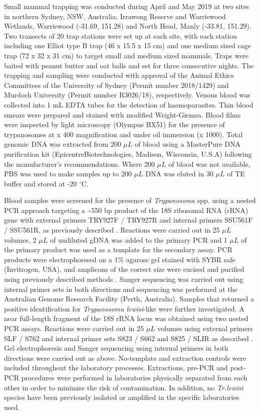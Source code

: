 \documentclass[a4paper, nobind]{templates/ociamthesis}
\begin{document}
Small mammal trapping was conducted during April and May 2019 at two sites in northern Sydney, NSW, Australia; Irrawong Reserve and Warriewood Wetlands, Warriewood (-31.69, 151.28) and North Head, Manly (-33.81, 151.29). Two transects of 20 trap stations were set up at each site, with each station including one Elliot type B trap (46 x 15.5 x 15 cm) and one medium sized cage trap (72 x 32 x 31 cm) to target small and medium sized mammals. Traps were baited with peanut butter and oat balls and set for three consecutive nights. The trapping and sampling were conducted with approval of the Animal Ethics Committees of the University of Sydney (Permit number 2018/1429) and Murdoch University (Permit number R3026/18), respectively. Venous blood was collected into 1 mL EDTA tubes for the detection of haemoparasites. Thin blood smears were prepared and stained with modified Wright-Giemsa. Blood films were inspected by light microscopy (Olympus BX51) for the presence of trypanosomes at x 400 magnification and under oil immersion (x 1000). Total genomic DNA was extracted from 200 \(\mu L\) of blood using a MasterPure DNA purification kit (Epicentre\textregistered Biotechnologies, Madison, Wisconsin, U.S.A) following the manufacturer's recommendations. Where 200 \(\mu L\) of blood was not available, PBS was used to make samples up to 200 \(\mu L\) DNA was eluted in 30 \(\mu L\) of TE buffer and stored at -20 \(^\circ\)C.

Blood samples were screened for the presence of \emph{Trypanosoma} spp. using a nested PCR approach targeting a \textasciitilde550 bp product of the 18S ribosomal RNA (rRNA) gene with external primers TRY927F / TRY927R and internal primers SSU561F / SSU561R, as previously described \autocite{noyesNestedPCRSsrRNA1999}. Reactions were carried out in 25 \(\mu L\) volumes, 2 \(\mu L\) of undiluted gDNA was added to the primary PCR and 1 \(\mu L\) of the primary product was used as a template for the secondary assay. PCR products were electrophoresed on a 1\% agarose gel stained with SYBR safe (Invitrogen, USA), and amplicons of the correct size were excised and purified using previously described methods \autocite{yangSpecificQuantitativeDetection2013}. Sanger sequencing was carried out using internal primer sets in both directions and sequencing was performed at the Australian Genome Research Facility (Perth, Australia). Samples that returned a positive identification for \emph{Trypanosoma lewisi}-like were further investigated. A near full-length fragment of the 18S rRNA locus was obtained using two nested PCR assays. Reactions were carried out in 25 \(\mu L\) volumes using external primers SLF / S762 and internal primer sets S823 / S662 and S825 / SLIR as described \autocite{mcinnesTrypanosomaIrwiniSp2009}. Gel electrophoresis and Sanger sequencing using internal primers in both directions were carried out as above. No-template and extraction controls were included throughout the laboratory processes. Extractions, pre-PCR and post-PCR procedures were performed in laboratories physically separated from each other in order to minimise the risk of contamination. In addition, no \emph{Tr.lewisi} species have been previously isolated or amplified in the specific laboratories used.
\end{document}
